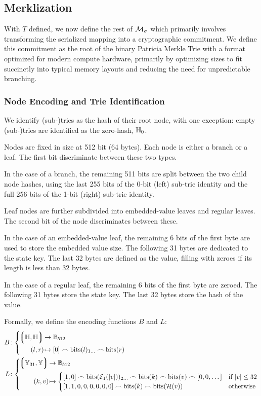 \subsection{Merklization}

With $T$ defined, we now define the rest of $\mathcal{M}_\sigma$ which primarily involves transforming the serialized mapping into a cryptographic commitment. We define this commitment as the root of the binary Patricia Merkle Trie with a format optimized for modern compute hardware, primarily by optimizing sizes to fit succinctly into typical memory layouts and reducing the need for unpredictable branching.

\subsubsection{Node Encoding and Trie Identification}
We identify (sub-)tries as the hash of their root node, with one exception: empty (sub-)tries are identified as the zero-hash, $\mathbb{H}_0$.

Nodes are fixed in size at 512 bit (64 bytes). Each node is either a branch or a leaf. The first bit discriminate between these two types.

In the case of a branch, the remaining 511 bits are split between the two child node hashes, using the last 255 bits of the 0-bit (left) sub-trie identity and the full 256 bits of the 1-bit (right) sub-trie identity.

Leaf nodes are further subdivided into embedded-value leaves and regular leaves. The second bit of the node discriminates between these.

In the case of an embedded-value leaf, the remaining 6 bits of the first byte are used to store the embedded value size. The following 31 bytes are dedicated to the state key. The last 32 bytes are defined as the value, filling with zeroes if its length is less than 32 bytes.

In the case of a regular leaf, the remaining 6 bits of the first byte are zeroed. The following 31 bytes store the state key. The last 32 bytes store the hash of the value.

Formally, we define the encoding functions $B$ and $L$:
\begin{align}
  B&\colon\abracegroup{
    \tuple{\hash, \hash} &\to \bitstringoflen{512}\\
    \tup{l, r} &\mapsto [0] \concat \text{bits}(l)\interval{1}{} \concat \text{bits}(r)
  }\\
  L&\colon\abracegroup{
    \tuple{\bloboflen{31}, \blob} &\to \bitstringoflen{512}\\
    \tup{k, v} &\mapsto \begin{cases}
      [1, 0] \concat \text{bits}(\fixedencode{1}{\len{v}})\interval{2}{} \concat \text{bits}(k) \concat \text{bits}(v) \concat [0, 0, \dots] &\when \len{v} \le 32\\
      [1, 1, 0, 0, 0, 0, 0, 0] \concat \text{bits}(k) \concat \text{bits}(\blake{v}) &\otherwise
    \end{cases}
  }
\end{align}

